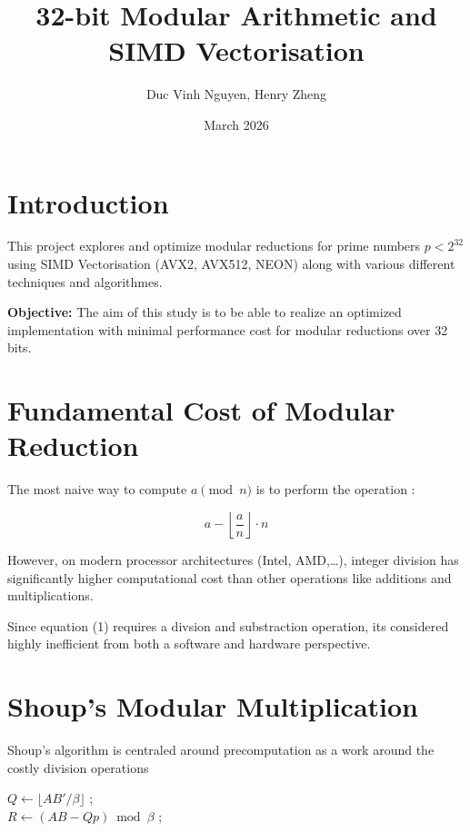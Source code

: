 \documentclass{article}
\title{32-bit Modular Arithmetic and SIMD Vectorisation}
\author{Duc Vinh Nguyen, Henry Zheng}
\date{March 2026}
\begin{document}
\maketitle

\section{Introduction}
This project explores and optimize modular reductions for prime numbers  $p < 2^{32}$ using SIMD Vectorisation (AVX2, AVX512, NEON) along with various different techniques and algorithmes.

\textbf{Objective: } The aim of this study is to be able to realize an optimized implementation with minimal performance cost for modular reductions over 32 bits.

\section{Fundamental Cost of Modular Reduction}
The most naive way to compute $a \pmod{n}$ is to perform the operation :

\begin{equation}
    a - \left\lfloor \frac{a}{n} \right\rfloor \cdot n
\end{equation}

However, on modern processor architectures (Intel, AMD,\dots), integer division has significantly higher computational cost than other operations like additions and multiplications.

Since equation (1) requires a divsion and substraction operation, its considered highly inefficient from both a software and hardware perspective.

\section{Shoup's Modular Multiplication}
Shoup's algorithm is centraled around precomputation as a work around the costly division operations

\begin{algorithm}[H]
    \caption{Shoup's modular multiplication algorithm}


    \Input{$A, B \in [0, p[$, we suppose that $p < \beta$/2 \\
    \hspace{1.2cm} precompute $B' = \lfloor B\beta/p \rfloor$}

    \BlankLine

    $Q \leftarrow \lfloor AB'/\beta \rfloor$ \quad ;\\
    $R \leftarrow (AB - Qp) \bmod \beta$ \quad ;

\end{algorithm}
\end{document}
